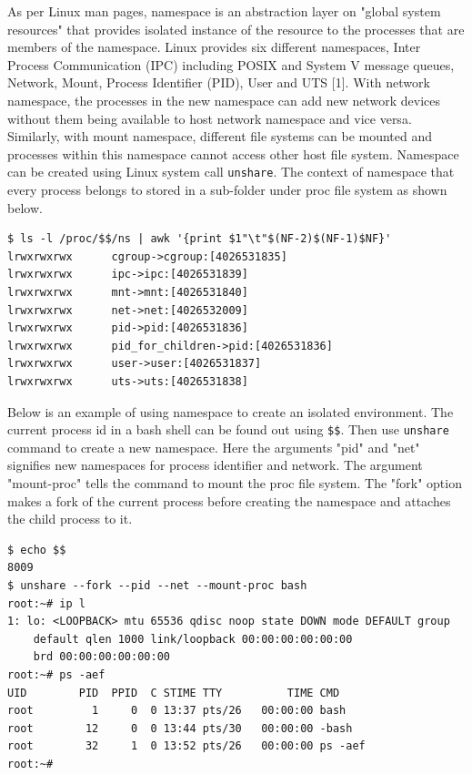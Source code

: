 \documentclass[english, 12pt, a4paper, elec, utf8, a-1b, online]{aaltothesis}
\begin{document}
As per Linux man pages, namespace is an abstraction layer on "global system resources" that provides isolated instance of the resource to the processes that are members of the namespace. Linux provides six different namespaces, Inter Process Communication (IPC) including POSIX and System V message queues, Network, Mount, Process Identifier (PID), User and UTS [1]. With network namespace, the processes in the new namespace can add new network devices without them being available to host network namespace and vice versa. Similarly, with mount namespace, different file systems can be mounted and processes within this namespace cannot access other host file system. Namespace can be created using Linux system call \lstinline{unshare}. The context of namespace that every process belongs to stored in a sub-folder under proc file system as shown below.

\begin{lstlisting}[basicstyle={\small\ttfamily}]
$ ls -l /proc/$$/ns | awk '{print $1"\t"$(NF-2)$(NF-1)$NF}'
lrwxrwxrwx      cgroup->cgroup:[4026531835]
lrwxrwxrwx      ipc->ipc:[4026531839]
lrwxrwxrwx      mnt->mnt:[4026531840]
lrwxrwxrwx      net->net:[4026532009]
lrwxrwxrwx      pid->pid:[4026531836]
lrwxrwxrwx      pid_for_children->pid:[4026531836]
lrwxrwxrwx      user->user:[4026531837]
lrwxrwxrwx      uts->uts:[4026531838]

\end{lstlisting}

Below is an example of using namespace to create an isolated environment. The current process id in a bash shell can be found out using \lstinline{$$}. Then use \lstinline{unshare} command to create a new namespace. Here the arguments "pid" and "net" signifies new namespaces for process identifier and network. The argument "mount-proc" tells the command to mount the proc file system. The "fork" option makes a fork of the current process before creating the namespace and attaches the child process to it. 

\begin{lstlisting}[basicstyle={\small\ttfamily}]
$ echo $$ 
8009
$ unshare --fork --pid --net --mount-proc bash
root:~# ip l
1: lo: <LOOPBACK> mtu 65536 qdisc noop state DOWN mode DEFAULT group
    default qlen 1000 link/loopback 00:00:00:00:00:00
    brd 00:00:00:00:00:00
root:~# ps -aef
UID        PID  PPID  C STIME TTY          TIME CMD
root         1     0  0 13:37 pts/26   00:00:00 bash
root        12     0  0 13:44 pts/30   00:00:00 -bash
root        32     1  0 13:52 pts/26   00:00:00 ps -aef
root:~#                                  

\end{lstlisting}
\end{document}
